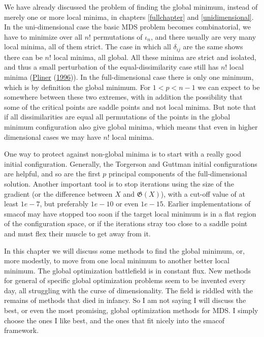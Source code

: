 \documentclass[
  12pt,
]{book}
\theoremstyle{definition}
\theoremstyle{definition}
\theoremstyle{definition}
\theoremstyle{definition}
\theoremstyle{remark}
\begin{document}
We have already discussed the problem of finding the global minimum, instead of merely one or more local minima, in chapters \ref{fullchapter} and \ref{unidimensional}. In the uni-dimensional case the basic MDS problem becomes combinatorial, we have to minimize over all \(n!\) permutations of \(\iota_n\), and there usually are very many local minima, all of them strict. The case in which all \(\delta_{ij}\) are the same shows there can be \(n!\) local minima, all global. All these minima are strict and isolated, and thus a small perturbation of the equal-dissimilarity case still has \(n!\) local minima (\protect\hyperlink{ref-pliner_96}{Pliner} (\protect\hyperlink{ref-pliner_96}{1996})). In the full-dimensional case there is only one minimum, which is by definition the global minimum. For \(1<p<n-1\) we can expect to be somewhere between these two extremes, with in addition the possibility that some of the critical points are saddle points and not local minima. But note that if all dissimilarities are equal all permutations of the points in the global minimum configuration also give global minima, which means that even in higher dimensional cases we may have \(n!\)
local minima.

One way to protect against non-global minima is to start with a really good initial configuration. Generally, the Torgerson and Guttman initial configurations are helpful, and so are the first \(p\) principal components of the full-dimensional solution. Another important tool is to stop iterations using the size of the gradient (or the difference between \(X\) and \(\mathfrak{G}(X)\)), with a cut-off value of at least \(1e-7\), but preferably \(1e-10\) or even \(1e-15\). Earlier implementations of smacof may have stopped too soon if the target local minimum is in a
flat region of the configuration space, or if the iterations stray too close to a saddle point and must flex their muscle to get away from it.

In this chapter we will discuss some methods to find the global minimum, or, more modestly, to move from one local minimum to another better local minimum. The global optimization battlefield is in constant flux. New methods for general of specific global optimization problems seem to be invented every day, all struggling with the curse of dimensionality. The field is riddled with the remains of methods that died in infancy. So I am not saying I will discuss the best, or even the most promising, global optimization methods for MDS. I simply choose the ones I like best, and the ones that fit nicely into the smacof framework.
\end{document}
